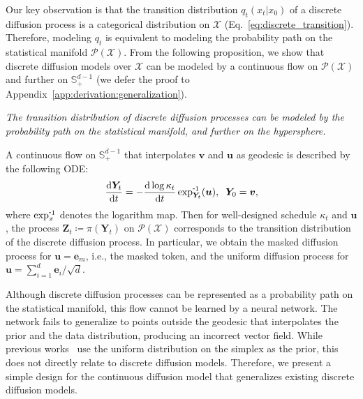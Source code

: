 Our key observation is that the transition distribution $q_t(x_t|x_0)$ of a discrete diffusion process is a categorical distribution on $\mathcal{X}$ (Eq.~\eqref{eq:discrete_transition}).
Therefore, modeling $q_t$ is equivalent to modeling the probability path on the statistical manifold $\mathcal{P}(\mathcal{X})$.
From the following proposition, we show that discrete diffusion models over $\mathcal{X}$ can be modeled by a continuous flow on $\mathcal{P}(\mathcal{X})$ and further on $\mathbb{S}^{d-1}_{+}$  (we defer the proof to Appendix~\ref{app:derivation:generalization}).
\vspace{1ex}
\begin{proposition}
    \it The transition distribution of discrete diffusion processes can be modeled by the probability path on the statistical manifold, and further on the hypersphere. 
\label{prop:discrete_generalize}
\end{proposition}
\vspace{-3ex}
\begin{sproof}
A continuous flow on $\mathbb{S}^{d-1}_{+}$ that interpolates $\bm{v}$ and $\bm{u}$ as geodesic is described by the following ODE:
\begin{align}
    \frac{\mathrm{d}\bm{Y}_t}{\mathrm{d}t} = -\frac{\mathrm{d}\log \kappa_t}{\mathrm{d}t} \logmap{\bm{Y}_t}{\bm{u}}, \;\; 
    \bm{Y}_0 = \bm{v},
\end{align}
where $\exp^{\scalebox{0.75}[1.0]{-}1}_{x}$ denotes the logarithm map. 
Then for well-designed schedule $\kappa_t$ and $\bm{u}$, the process $\bm{Z}_t\coloneqq \pi(\bm{Y}_t)$ on $\mathcal{P}(\mathcal{X})$ corresponds to the transition distribution of the discrete diffusion process.
In particular, we obtain the masked diffusion process for $\bm{u}=\bm{e}_m$, i.e., the masked token, and the uniform diffusion process for $\bm{u}=\sum^{d}_{i=1} \bm{e}_i/\sqrt{d}$.
\end{sproof}
\vspace{-1ex}

Although discrete diffusion processes can be represented as a probability path on the statistical manifold, this flow cannot be learned by a neural network. The network fails to generalize to points outside the geodesic that interpolates the prior and the data distribution, producing an incorrect vector field.
While previous works~\citep{cheng2024categorical,davis2024fisherflow} use the uniform distribution on the simplex as the prior, this does not directly relate to discrete diffusion models.
Therefore, we present a simple design for the continuous diffusion model that generalizes existing discrete diffusion models.



